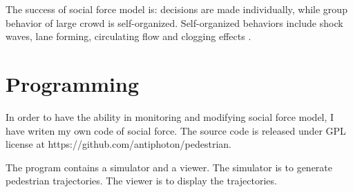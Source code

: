 \documentclass{article}
\begin{document}
        The success of social force model is:
        decisions are made individually, while group behavior of large crowd is self-organized.
        Self-organized behaviors include shock waves, lane forming, circulating flow and clogging effects \cite{helbing2005self}.

    \section{Programming}
        In order to have the ability in monitoring and modifying social force model, I have writen my own code of social force.
        The source code is released under GPL license at https://github.com/antiphoton/pedestrian.

        The program contains a simulator and a viewer.
        The simulator is to generate pedestrian trajectories.
        The viewer is to display the trajectories.
\end{document}
